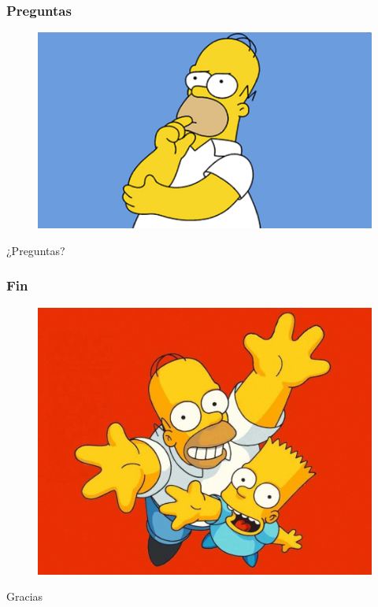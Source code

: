 \documentclass[10pt,a4paper]{beamer}
\begin{document}
\begin{frame}

	\frametitle{Preguntas}
	\begin{figure}[hbtp]
		\includegraphics[scale=0.5]{img/preguntas.png}
	\end{figure}
	\begin{center}
		\huge{¿Preguntas?}
	\end{center}
	
\end{frame}

\begin{frame}

	\frametitle{Fin}
	\begin{figure}[hbtp]
		\includegraphics[scale=0.15]{img/gracias.jpg}
	\end{figure}
	\begin{center}
		\huge{Gracias}
	\end{center}
	
\end{frame}
\end{document}
